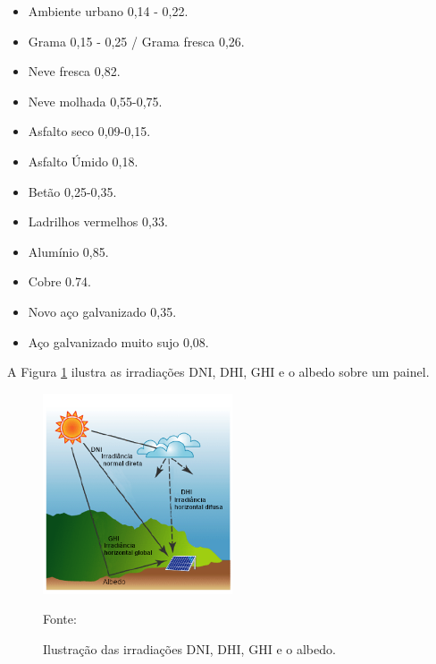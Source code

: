 \begin{itemize}
  \item Ambiente urbano 0,14 - 0,22.

  \item Grama 0,15 - 0,25 / Grama fresca 0,26.

  \item Neve fresca 0,82.

  \item Neve molhada 0,55-0,75.

  \item Asfalto seco 0,09-0,15.

  \item Asfalto Úmido 0,18.

  \item Betão 0,25-0,35.

  \item Ladrilhos vermelhos 0,33.

  \item Alumínio 0,85.

  \item Cobre 0.74.

  \item Novo aço galvanizado 0,35.

  \item Aço galvanizado muito sujo 0,08.

\end{itemize}

A Figura \ref{fig:dni-dhi-ghi} ilustra as irradiações DNI, DHI, GHI e o albedo sobre um painel.

\begin{figure}[H]
    \centering
    \includegraphics[width=0.5\textwidth]{./Figuras/dni-dhi-ghi.png}
    \caption{Ilustração das irradiações DNI, DHI, GHI e o albedo.}{Fonte: \cite{esri}}
   \label{fig:dni-dhi-ghi}
\end{figure}

